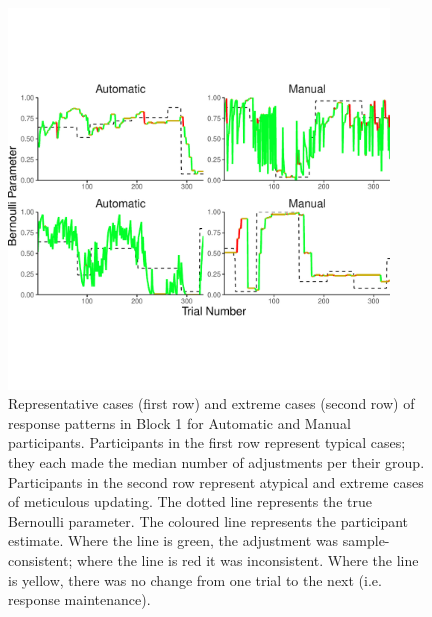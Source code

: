 \documentclass[sn-apa]{sn-jnl}\usepackage[]{graphicx}\usepackage[]{xcolor}
\newenvironment{knitrout}{}{} %
\begin{document}
\begin{figure}[htp]
\centering




\begin{knitrout}
\color{fgcolor}
\includegraphics[width=0.9\textwidth]{figure/unnamed-chunk-16-1} 
\end{knitrout}
\caption{Representative cases (first row) and extreme cases (second row) of response patterns in Block 1 for Automatic and Manual participants. Participants in the first row represent typical cases; they each made the median number of adjustments per their group. Participants in the second row represent atypical and extreme cases of meticulous updating. The dotted line represents the true Bernoulli parameter. The coloured line represents the participant estimate. Where the line is green, the adjustment was sample-consistent; where the line is red it was inconsistent. Where the line is yellow, there was no change from one trial to the next (i.e. response maintenance).}
\label{fig:representative_ppts}
\end{figure}
\end{document}

